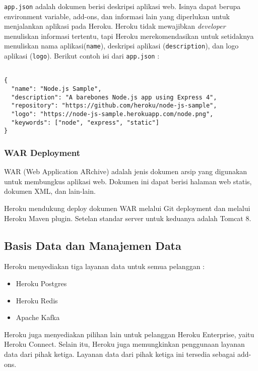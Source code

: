 \texttt{app.json} adalah dokumen berisi deskripsi aplikasi web. Isinya dapat berupa environment variable, add-ons, dan informasi lain yang diperlukan untuk menjalankan aplikasi pada Heroku. Heroku tidak mewajibkan \textit{developer} menuliskan informasi tertentu, tapi Heroku merekomendasikan untuk setidaknya menuliskan nama aplikasi(\texttt{name}), deskripsi aplikasi (\texttt{description}), dan logo aplikasi (\texttt{logo}). Berikut contoh isi dari \texttt{app.json} :
\begin{lstlisting}

{
  "name": "Node.js Sample",
  "description": "A barebones Node.js app using Express 4",
  "repository": "https://github.com/heroku/node-js-sample",
  "logo": "https://node-js-sample.herokuapp.com/node.png",
  "keywords": ["node", "express", "static"]
}

\end{lstlisting}

\subsubsection{WAR Deployment}
WAR (Web Application ARchive) adalah jenis dokumen arsip yang digunakan untuk membungkus aplikasi web. Dokumen ini dapat berisi halaman web statis, dokumen XML, dan lain-lain. \cite{etzkorn2017introduction}
 
Heroku mendukung deploy dokumen WAR melalui Git deployment dan melalui Heroku Maven plugin. Setelan standar server untuk keduanya adalah Tomcat 8.

\subsection{Basis Data dan Manajemen Data}
Heroku menyediakan tiga layanan data untuk semua pelanggan :
\begin{itemize}
\item Heroku Postgres
\item Heroku Redis
\item Apache Kafka
\end{itemize}
Heroku juga menyediakan pilihan lain untuk pelanggan Heroku Enterprise, yaitu Heroku Connect. Selain itu, Heroku juga memungkinkan penggunaan layanan data dari pihak ketiga. Layanan data dari pihak ketiga ini tersedia sebagai add-ons.

